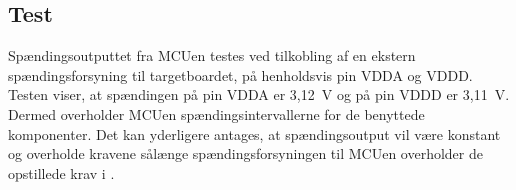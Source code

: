 \subsection{Test}
Spændingsoutputtet fra MCUen testes ved tilkobling af en ekstern spændingsforsyning til targetboardet, på henholdsvis pin VDDA og VDDD.  \newline
Testen viser, at spændingen på pin VDDA er 3,12~V og på pin VDDD er 3,11~V. Dermed overholder MCUen spændingsintervallerne for de benyttede komponenter. Det kan yderligere antages, at spændingsoutput vil være konstant og overholde kravene sålænge spændingsforsyningen til MCUen overholder de opstillede krav i .

